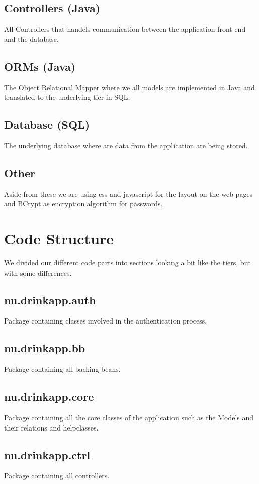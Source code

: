 \documentclass[a4paper]{article}
\begin{document}
\subsection{Controllers (Java)}
All Controllers that handels communication between the application front-end and the database.
\subsection{ORMs (Java)}
The Object Relational Mapper where we all models are implemented in Java and translated to the underlying tier in SQL. 
\subsection{Database (SQL)}
The underlying database where are data from the application are being stored.
\subsection{Other}
Aside from these we are using css and javascript for the layout on the web pages and BCrypt as encryption algorithm for passwords. 

\section{Code Structure}
We divided our different code parts into sections looking a bit like the tiers, but with some differences.

\subsection{nu.drinkapp.auth}
Package containing classes involved in the authentication process.

\subsection{nu.drinkapp.bb}
Package containing all backing beans.

\subsection{nu.drinkapp.core}
Package containing all the core classes of the application such as the Models and their relations and helpclasses.

\subsection{nu.drinkapp.ctrl}
Package containing all controllers.
\end{document}
